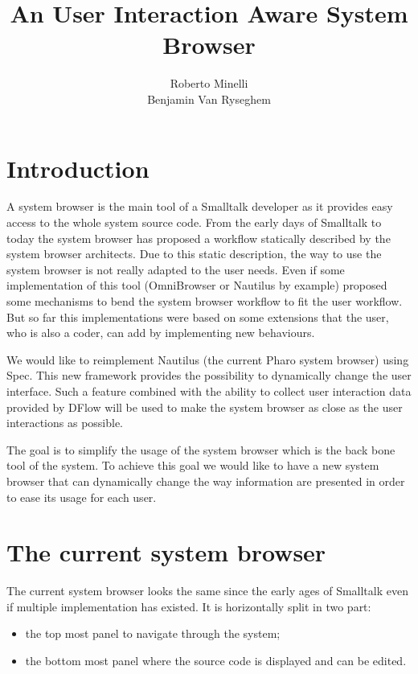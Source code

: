 \documentclass[12pt]{article}
\newcommand{\dflow}{DFlow\xspace}
\begin{document}
\title{An User Interaction Aware System Browser}
\author{Roberto Minelli\\Benjamin Van Ryseghem}
\maketitle

\section{Introduction}

A system browser is the main tool of a Smalltalk developer as it provides easy access to the whole system source code.
From the early days of Smalltalk to today the system browser has proposed a workflow statically described by the system browser architects.
Due to this static description, the way to use the system browser is not really adapted to the user needs. 
Even if some implementation of this tool (OmniBrowser or Nautilus by example) proposed some mechanisms to bend the system browser workflow to fit the user workflow.
But so far this implementations were based on some extensions that the user, who is also a coder, can add by implementing new behaviours.

We would like to reimplement Nautilus (the current Pharo system browser) using Spec.
This new framework provides the possibility to dynamically change the user interface.
Such a feature combined with the ability to collect user interaction data provided by \dflow will be used to make the system browser 
as close as the user interactions as possible.

The goal is to simplify the usage of the system browser which is the back bone tool of the system. 
To achieve this goal we would like to have a new system browser that can dynamically change the way information are presented in order to ease its usage for each user.


\section{The current system browser}\label{sec:browser}

The current system browser looks the same since the early ages of Smalltalk even if multiple implementation has existed.
It is horizontally split in two part:
\begin{itemize}
	\item the top most panel to navigate through the system;
	\item the bottom most panel where the source code is displayed and can be edited.
\end{itemize}
\end{document}
